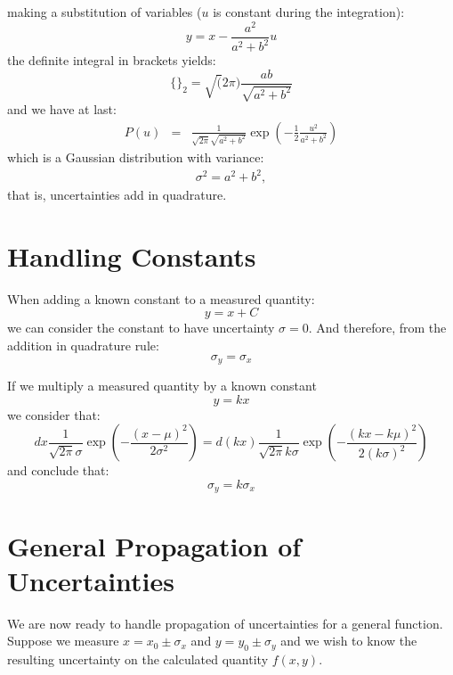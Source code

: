 \documentclass[12pt]{article}
\begin{document}
making a substitution of variables ($u$ is constant during the integration):
\begin{equation*}
y = x-\frac{a^2}{a^2+b^2}u
\end{equation*}
the definite integral in brackets yields:
\begin{equation}
\{\}_2 = \sqrt(2 \pi) \frac{a b}{\sqrt{a^2+b^2}}
\end{equation}
and we have at last:
\begin{eqnarray*}
P(u) &=& \frac{1}{\sqrt{2\pi} \sqrt{a^2+b^2}}  \exp \left( -\frac{1}{2} \frac{u^2}{a^2+b^2} \right)
\end{eqnarray*}
which is a Gaussian distribution with variance:
\begin{eqnarray*}
\sigma^2 = a^2 + b^2,
\end{eqnarray*}
that is, uncertainties add in quadrature.

\section{Handling Constants}

When adding a known constant to a measured quantity:
\begin{equation*}
y = x + C
\end{equation*}
we can consider the constant to have uncertainty $\sigma=0$.  And therefore, from the addition in quadrature rule:
\begin{equation*}
\sigma_y = \sigma_x
\end{equation*}

If we multiply a measured quantity by a known constant 
\begin{equation*}
y = k x 
\end{equation*}
we consider that:
\begin{displaymath}
dx \frac{1}{\sqrt{2\pi} \sigma} \exp\left(-\frac{(x-\mu)^2}{2\sigma^2}\right) = d(kx) \frac{1}{\sqrt{2\pi} k\sigma} \exp\left(-\frac{(kx-k\mu)^2}{2(k\sigma)^2}\right)
\end{displaymath}
and conclude that:
\begin{equation*}
\sigma_y = k \sigma_x
\end{equation*}

\section{General Propagation of Uncertainties}
We are now ready to handle propagation of uncertainties for a general function.  Suppose we measure $x = x_0 \pm \sigma_x$ and $y = y_0 \pm \sigma_y$ and we wish to know the resulting uncertainty on the calculated quantity $f(x,y)$.
\end{document}
